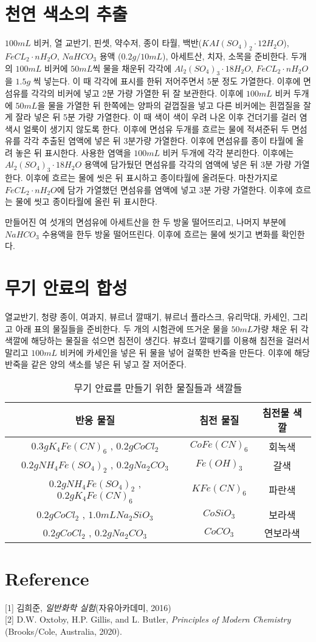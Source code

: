 \documentclass[%
 reprint,
 amsmath,amssymb,
 aps,
]{revtex4-2}
\begin{document}
\section{\label{sec:level2}천연 색소의 추출}
$100mL$ 비커, 열 교반기, 핀셋, 약수저, 종이 타월, 백반($KAI(SO_{4})_{2}\cdot 12H_{2}O$), $FeCL_{2}\cdot nH_{2}O$, $NaHCO_{3}$ 용액 ($0.2g/10mL$), 아세트산, 치자, 소목을 준비한다. 두개의 $100mL$ 비커에 $50mL$씩 물을 채운뒤 각각에 $Al_{2}(SO_{4})_{3}\cdot18H_{2}O$, $FeCL_{2}\cdot nH_{2}O$을 $1.5g$ 씩 넣는다. 이 때 각각에 표시를 한뒤 저어주면서 5분 정도 가열한다. 이후에 면섬유를 각각의 비커에 넣고 2분 가량 가열한 뒤 잘 보관한다. 이후에 $100mL$ 비커 두개에 $50mL$을 물을 가열한 뒤 한쪽에는 양파의 겉껍질을 넣고 다른 비커에는 흰껍질을 잘게 잘라 넣은 뒤 5분 가량 가열한다. 이 때 색이 색이 우려 나온 이후 건더기를 걸러 염색시 얼룩이 생기지 않도록 한다. 이후에 면섬유 두개를 흐르는 물에 적셔준뒤 두 면섬유를 각각 추출된 염액에 넣은 뒤 3분가량 가열한다. 이후에 면섬유를 종이 타월에 올려 놓은 뒤 표시한다.  사용한 염액을 $100mL$ 비커 두개에 각각 분리한다. 이후에는 $Al_{2}(SO_{4})_{3}\cdot18H_{2}O$ 용액에 담가뒀던 면섬유를 각각의 염액에 넣은 뒤 3분 가량 가열한다. 이후에 흐르는 물에 씻은 뒤 표시하고 종이타월에 올려둔다. 마찬가지로 $FeCL_{2}\cdot nH_{2}O$에 담가 가열했던 면섬유를 염액에 넣고 3분 가량 가열한다. 이후에 흐르는 물에 씻고 종이타월에 올린 뒤 표시한다.

만들어진 여 섯개의 면섬유에 아세트산을 한 두 방울 떨어뜨리고, 나머지 부분에 $NaHCO_{3}$ 수용액을 한두 방울 떨어뜨린다. 이후에 흐르는 물에 씻기고 변화를 확인한다.

\section{\label{sec:level2}무기 안료의 합성}
열교반기, 청량 종이, 여과지, 뷰르너 깔때기, 뷰르너 플라스크, 유리막대, 카세인, 그리고 아래 표의 물질들을 준비한다. 두 개의 시험관에 뜨거운 물을 $50mL$가량 채운 뒤 각 색깔에 해당하는 물질을 섞으면 침전이 생긴다. 뷰흐너 깔때기를 이용해 침전을 걸러서 말리고 $100mL$ 비커에 카세인을 넣은 뒤 물을 넣어 걸쭉한 반죽을 만든다. 이후에 해당 반죽을 같은 양의 색소를 넣은 뒤 넣고 잘 저어준다.
\begin{table}[]
\begin{tabular}{c|c|c} \hline \hline
반응 물질 & 침전 물질 & 침전물 색깔 \\ \hline
$0.3g K_{4}Fe(CN)_{6}$ , $0.2g CoCl_{2}$ & $CoFe(CN)_{6}$ & 회녹색 \\ \hline
$0.2g NH_{4}Fe(SO_{4})_{2}$ , $0.2g Na_{2}CO_{3}$ & $Fe(OH)_{3}$ & 갈색 \\ \hline
$0.2g NH_{4}Fe(SO_{4})_{2}$ , $0.2g K_{4}Fe(CN)_{6}$ & $KFe(CN)_{6}$ & 파란색 \\ \hline
$0.2g CoCl_{2}$ , $1.0mL Na_{2}SiO_{3}$ & $CoSiO_{3}$ & 보라색 \\ \hline
$0.2g CoCl_{2}$ , $0.2g Na_{2}CO_{3}$ & $CoCO_{3}$ & 연보라색 \\ \hline \hline
\end{tabular}
\caption{\label{tab:C18}무기 안료를 만들기 위한 물질들과 색깔들}
\end{table}

\section{\label{sec:level1}Reference}
[1] 김희준, \textit{일반화학 실험}(자유아카데미, 2016)\\

[2] D.W. Oxtoby, H.P. Gillis, and L. Butler, \textit{Principles of Modern Chemistry} (Brooks/Cole, Australia, 2020).
\end{document}
